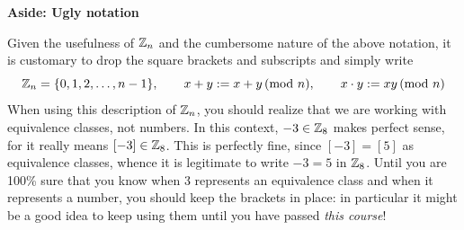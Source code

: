 \begin{aside}{}{}
{\bf Aside: Ugly notation}

Given the usefulness of $\mathbb{Z}_n$ and the cumbersome nature of the above notation, it is customary to drop the square brackets and subscripts and simply write
\[
	\mathbb{Z}_n=\{0,1,2,\ldots,n-1\},\qquad x+y:=x+y\negthickspace\pmod{n},\qquad x\cdot y:=xy\negthickspace\pmod{n}
\]
When using this description of $\mathbb{Z}_n$, you should realize that we are working with equivalence classes, not numbers. In this context, $-3\in\mathbb{Z}_8$ makes perfect sense, for it really means $[-3]\in\mathbb{Z}_8$. This is perfectly fine, since $[-3]=[5]$ as equivalence classes, whence it is legitimate to write $-3=5$ in $\mathbb{Z}_8$. Until you are 100\% sure that you know when 3 represents an equivalence class and when it represents a number, you should keep the brackets in place: in particular it might be a good idea to keep using them until you have passed \emph{this course}!
\end{aside}

% 
% 

